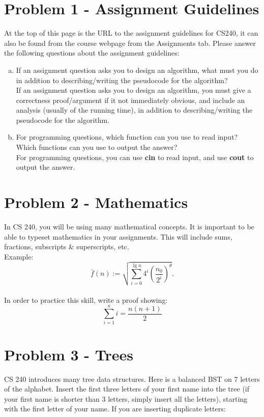 \documentclass[12pt]{article}
\begin{document}

\section*{Problem 1 - Assignment Guidelines}
At the top of this page is the URL to the assignment guidelines for CS240, it can also be found from the course webpage from the Assignments tab. Please answer the following questions about the assignment guidelines:

\begin{enumerate}[a)] 
	\item If an assignment question asks you to design an algorithm, what must you do in addition to describing/writing the pseudocode for the algorithm? \\
	If an assignment question asks you to design an algorithm, you must give a correctness proof/argument if it not immediately obvious, and include an analysis (usually of the running time), in addition to describing/writing the pseudocode for the algorithm.
	\item For programming questions, which function can you use to read input? \\ Which functions can you use to output the answer? \\
	For programming questions, you can use {\bf cin} to read input, and use {\bf cout} to output the answer.
\end{enumerate}

\section*{Problem 2 - Mathematics}
In CS 240, you will be using many mathematical concepts. It is important to be able to typeset mathematics in your assignments. This will include sums, fractions, subscripts \& superscripts, etc. \\
Example: 
$$\bar{f}(n) := \sqrt {\sum_{i=0}^{\lg n} 4^i \left ( \frac{n_0}{2^i} \right )^{\theta}}.$$
\\
In order to practice this skill, write a proof showing: $$\sum_{i=1}^n i = \frac {n(n+1)} {2}$$

\section*{Problem 3 - Trees}
CS 240 introduces many tree data structures. Here is a balanced BST on 7 letters of the 
alphabet. Insert the first three letters of your first name into the tree (if your first 
name is shorter than 3 letters, simply insert all the letters), starting 
with the first letter of your name. If you are inserting duplicate
letters:
\end{document}
